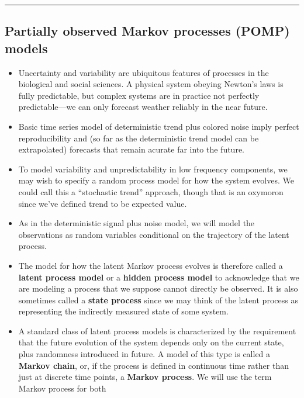 \documentclass[]{article}
\begin{document}
\begin{center}\rule{0.5\linewidth}{\linethickness}\end{center}

\subsection{Partially observed Markov processes (POMP)
models}\label{partially-observed-markov-processes-pomp-models}

\begin{itemize}
\item
  Uncertainty and variability are ubiquitous features of processes in
  the biological and social sciences. A physical system obeying Newton's
  laws is fully predictable, but complex systems are in practice not
  perfectly predictable---we can only forecast weather reliably in the
  near future.
\item
  Basic time series model of deterministic trend plus colored noise
  imply perfect reproducibility and (so far as the deterministic trend
  model can be extrapolated) forecasts that remain acurate far into the
  future.
\item
  To model variability and unpredictability in low frequency components,
  we may wish to specify a random process model for how the system
  evolves. We could call this a ``stochastic trend'' approach, though
  that is an oxymoron since we've defined trend to be expected value.
\item
  As in the deterministic signal plus noise model, we will model the
  observations as random variables conditional on the trajectory of the
  latent process.
\item
  The model for how the latent Markov process evolves is therefore
  called a \textbf{latent process model} or a \textbf{hidden process
  model} to acknowledge that we are modeling a process that we suppose
  cannot directly be observed. It is also sometimes called a
  \textbf{state process} since we may think of the latent process as
  representing the indirectly measured state of some system.
\item
  A standard class of latent process models is characterized by the
  requirement that the future evolution of the system depends only on
  the current state, plus randomness introduced in future. A model of
  this type is called a \textbf{Markov chain}, or, if the process is
  defined in continuous time rather than just at discrete time points, a
  \textbf{Markov process}. We will use the term Markov process for both

\end{itemize}
\end{document}
